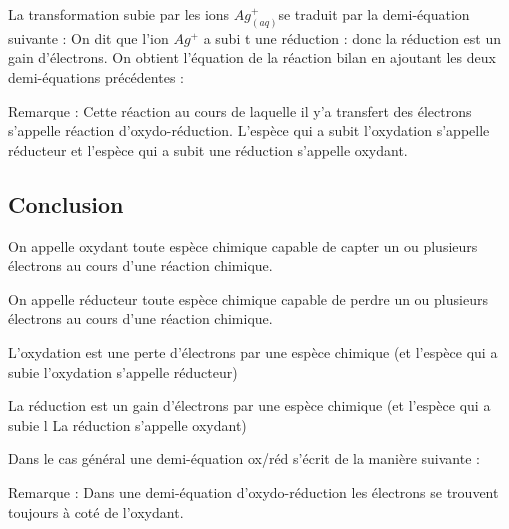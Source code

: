 \documentclass[12pt]{article}
\begin{document}
La transformation subie par les ions $Ag^+_{(aq)}$se traduit par la demi-équation suivante :
On dit que l’ion $Ag^+$ a subi t une réduction : donc la réduction est un gain d’électrons.
On obtient l’équation de la réaction bilan en ajoutant les deux demi-équations précédentes :
\begin{center}



\end{center}

Remarque : Cette réaction au cours de laquelle il y’a transfert des électrons s’appelle réaction d’oxydo-réduction.
L’espèce qui a subit l’oxydation s’appelle réducteur et l’espèce qui a subit une réduction s’appelle oxydant.
\subsection{Conclusion }
On appelle oxydant toute espèce chimique capable de capter un ou plusieurs électrons au cours d’une réaction chimique.

On appelle réducteur toute espèce chimique capable de perdre un ou plusieurs électrons au cours d’une réaction chimique.

L’oxydation est une perte d’électrons par une espèce chimique (et l’espèce qui a subie l’oxydation s’appelle réducteur)

La réduction est un gain d’électrons par une espèce chimique (et l’espèce qui a subie l La réduction s’appelle oxydant)

Dans le cas général une demi-équation ox/réd s’écrit de la manière suivante :



Remarque : Dans une demi-équation d’oxydo-réduction les électrons se trouvent toujours à coté de l’oxydant.
\end{document}
